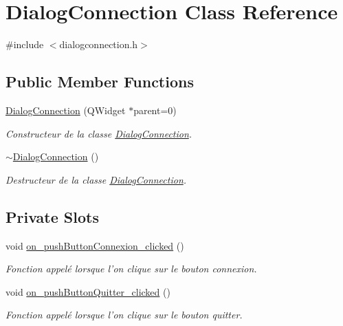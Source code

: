 \hypertarget{class_dialog_connection}{\section{Dialog\-Connection Class Reference}
\label{class_dialog_connection}
}


{\ttfamily \#include $<$dialogconnection.\-h$>$}

\subsection*{Public Member Functions}
\begin{DoxyCompactItemize}
\item 
\hyperlink{class_dialog_connection_aac361ca106ca562a954c22f9af249a52}{Dialog\-Connection} (Q\-Widget $\ast$parent=0)
\begin{DoxyCompactList}\small\item\em Constructeur de la classe \hyperlink{class_dialog_connection}{Dialog\-Connection}. \end{DoxyCompactList}\item 
\hyperlink{class_dialog_connection_a9bb9252309439dddf408ec178271fc4b}{$\sim$\-Dialog\-Connection} ()
\begin{DoxyCompactList}\small\item\em Destructeur de la classe \hyperlink{class_dialog_connection}{Dialog\-Connection}. \end{DoxyCompactList}\end{DoxyCompactItemize}
\subsection*{Private Slots}
\begin{DoxyCompactItemize}
\item 
void \hyperlink{class_dialog_connection_a0c182c6bb207ceb918fc98bdbec6da00}{on\-\_\-push\-Button\-Connexion\-\_\-clicked} ()
\begin{DoxyCompactList}\small\item\em Fonction appelé lorsque l'on clique sur le bouton connexion. \end{DoxyCompactList}\item 
void \hyperlink{class_dialog_connection_a2f7be37625bd6d71129a53a315394c73}{on\-\_\-push\-Button\-Quitter\-\_\-clicked} ()
\begin{DoxyCompactList}\small\item\em Fonction appelé lorsque l'on clique sur le bouton quitter. \end{DoxyCompactList}\end{DoxyCompactItemize}
